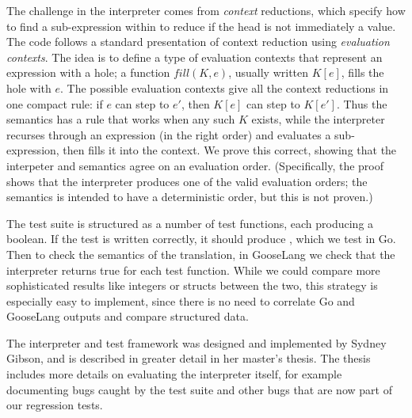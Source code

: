 The challenge in the interpreter comes from \emph{context} reductions,
which specify how to find a sub-expression within  to reduce
if the head is not immediately a value. The code follows a standard
presentation of context reduction using \emph{evaluation contexts}. The
idea is to define a type of evaluation contexts  that
represent an expression with a hole; a function \(fill(K, e)\), usually
written \(K[e]\), fills the hole with \(e\). The possible evaluation
contexts give all the context reductions in one compact rule: if \(e\)
can step to \(e'\), then \(K[e]\) can step to \(K[e']\). Thus the
semantics has a rule that works when any such \(K\) exists, while the
interpreter recurses through an expression (in the right order) and
evaluates a sub-expression, then fills it into the context. We prove
this correct, showing that the interpeter and semantics agree on an
evaluation order. (Specifically, the proof shows that the interpreter
produces one of the valid evaluation orders; the semantics is intended
to have a deterministic order, but this is not proven.)

The test suite is structured as a number of test functions, each
producing a boolean. If the test is written correctly, it should produce
, which we test in Go. Then to check the semantics of the
translation, in GooseLang we check that the interpreter returns true for
each test function. While we could compare more sophisticated results
like integers or structs between the two, this strategy is especially
easy to implement, since there is no need to correlate Go and GooseLang
outputs and compare structured data.

The interpreter and test framework was designed and implemented by
Sydney Gibson, and is described in greater detail in her master's
thesis. The thesis includes more details on evaluating the interpreter
itself, for example documenting bugs caught by the test suite and other
bugs that are now part of our regression tests.
